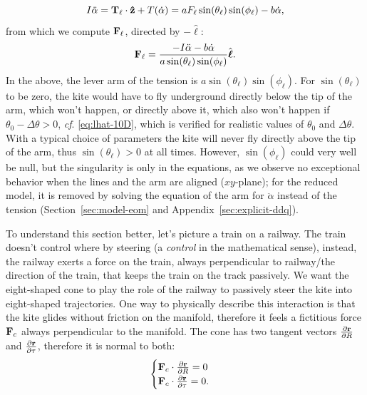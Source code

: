 \begin{equation} \label{eq:newton_arm_10D}
    I \ddot \alpha
    = \vb T_\ell \cdot \vu z + T(\dot \alpha)
    = a F_\ell \sin(\theta_\ell) \sin(\phi_\ell) - b \dot \alpha,
\end{equation}
from which we compute $\vb F_\ell$, directed by $-\hat{\boldsymbol{\ell}}$:
\begin{equation} \label{eq:f_lines-10D}
    \vb F_\ell = \frac{-I \ddot \alpha - b \dot \alpha}{a \sin(\theta_\ell) \sin(\phi_\ell)} \hat{\boldsymbol{\ell}}.
\end{equation}
In the above, the lever arm of the tension is $a \sin(\theta_\ell) \sin(\phi_\ell)$. For $\sin(\theta_\ell)$ to be zero, the kite would have to fly underground directly below the tip of the arm, which won't happen, or directly above it, which also won't happen if $\theta_0 - \Delta \theta > 0$, \emph{cf}. \eqref{eq:lhat-10D}, which is verified for realistic values of $\theta_0$ and $\Delta \theta$.
With a typical choice of parameters the kite will never fly directly above the tip of the arm, thus $\sin(\theta_\ell) > 0$ at all times.
However, $\sin(\phi_\ell)$ could very well be null, but the singularity is only in the equations, as we observe no exceptional behavior when the lines and the arm are aligned ($xy$-plane); for the reduced model, it is removed by solving the equation of the arm for $\ddot\alpha$ instead of the tension (Section~\ref{sec:model-eom} and Appendix~\ref{sec:explicit-ddq}).

To understand this section better, let's picture a train on a railway.
The train doesn't control where by steering (a \emph{control} in the mathematical sense), instead, the railway exerts a force on the train, always perpendicular to railway/the direction of the train, that keeps the train on the track passively.
We want the eight-shaped cone to play the role of the railway to passively steer the kite into eight-shaped trajectories.
One way to physically describe this interaction is that the kite glides without friction on the manifold, therefore it feels a fictitious force $\vb F_c$ always perpendicular to the manifold.
The cone has two tangent vectors $\pdv{\vb r}{R}$ and $\pdv{\vb r}{\tau}$, therefore it is normal to both:
\begin{equation}\begin{cases} \label{eq:f_cone_constraint_10D}
    \vb F_c \cdot \pdv{\vb r}{R} = 0 \\
    \vb F_c \cdot \pdv{\vb r}{\tau} = 0.
\end{cases}\end{equation}

